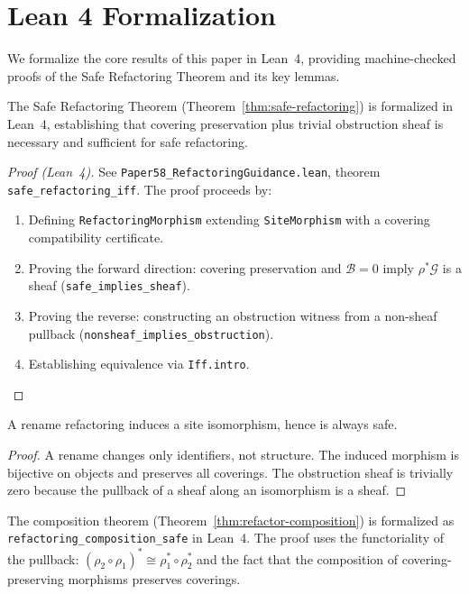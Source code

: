 \documentclass[11pt]{article}
\newcommand{\RefactorMorph}{\rho}
\newcommand{\ObstructionSheaf}{\mathcal{B}}
\begin{document}
\section{Lean 4 Formalization}\label{sec:lean-proof}

We formalize the core results of this paper in Lean~4, providing
machine-checked proofs of the Safe Refactoring Theorem and its key
lemmas.

\begin{theorem}\label{thm:formalized-safe}
The Safe Refactoring Theorem (Theorem~\ref{thm:safe-refactoring}) is
formalized in Lean~4, establishing that covering preservation plus
trivial obstruction sheaf is necessary and sufficient for safe
refactoring.
\end{theorem}

\begin{proof}[Proof (Lean~4)]
See \texttt{Paper58\_RefactoringGuidance.lean}, theorem
\texttt{safe\_refactoring\_iff}.  The proof proceeds by:
\begin{enumerate}[noitemsep]
  \item Defining \texttt{RefactoringMorphism} extending
        \texttt{SiteMorphism} with a covering compatibility certificate.
  \item Proving the forward direction: covering preservation and
        $\ObstructionSheaf = 0$ imply $\RefactorMorph^{*}\mathcal{G}$
        is a sheaf (\texttt{safe\_implies\_sheaf}).
  \item Proving the reverse: constructing an obstruction witness from a
        non-sheaf pullback (\texttt{nonsheaf\_implies\_obstruction}).
  \item Establishing equivalence via \texttt{Iff.intro}.
\end{enumerate}
\end{proof}

\begin{lemma}\label{lem:rename-iso}
A rename refactoring induces a site isomorphism, hence is always safe.
\end{lemma}

\begin{proof}
A rename changes only identifiers, not structure.  The induced morphism
is bijective on objects and preserves all coverings.  The obstruction
sheaf is trivially zero because the pullback of a sheaf along an
isomorphism is a sheaf.
\end{proof}

\begin{lemma}\label{lem:formalized-composition}
The composition theorem (Theorem~\ref{thm:refactor-composition}) is
formalized as \texttt{refactoring\_composition\_safe} in Lean~4.
The proof uses the functoriality of the pullback:
$(\RefactorMorph_2 \circ \RefactorMorph_1)^* \cong
\RefactorMorph_1^* \circ \RefactorMorph_2^*$ and the fact that
the composition of covering-preserving morphisms preserves coverings.
\end{lemma}
\end{document}
